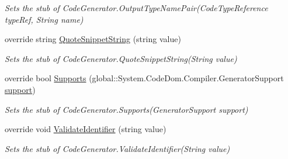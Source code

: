 \begin{DoxyCompactItemize}
\begin{DoxyCompactList}\small\item\em Sets the stub of Code\-Generator.\-Output\-Type\-Name\-Pair(\-Code\-Type\-Reference type\-Ref, String name)\end{DoxyCompactList}\item 
override string \hyperlink{class_system_1_1_code_dom_1_1_compiler_1_1_fakes_1_1_stub_code_generator_a6d7cf472f8b3dbca40a340aacf2819e5}{Quote\-Snippet\-String} (string value)
\begin{DoxyCompactList}\small\item\em Sets the stub of Code\-Generator.\-Quote\-Snippet\-String(\-String value)\end{DoxyCompactList}\item 
override bool \hyperlink{class_system_1_1_code_dom_1_1_compiler_1_1_fakes_1_1_stub_code_generator_a750c96c87857bbb43477d7d086730f44}{Supports} (global\-::\-System.\-Code\-Dom.\-Compiler.\-Generator\-Support \hyperlink{jquery-1_810_82-vsdoc_8js_a1be69652377630fc5432ae5ec6463744}{support})
\begin{DoxyCompactList}\small\item\em Sets the stub of Code\-Generator.\-Supports(\-Generator\-Support support)\end{DoxyCompactList}\item 
override void \hyperlink{class_system_1_1_code_dom_1_1_compiler_1_1_fakes_1_1_stub_code_generator_af1d8911596eefa54be660a1a06820cfa}{Validate\-Identifier} (string value)
\begin{DoxyCompactList}\small\item\em Sets the stub of Code\-Generator.\-Validate\-Identifier(\-String value)\end{DoxyCompactList}\end{DoxyCompactItemize}
